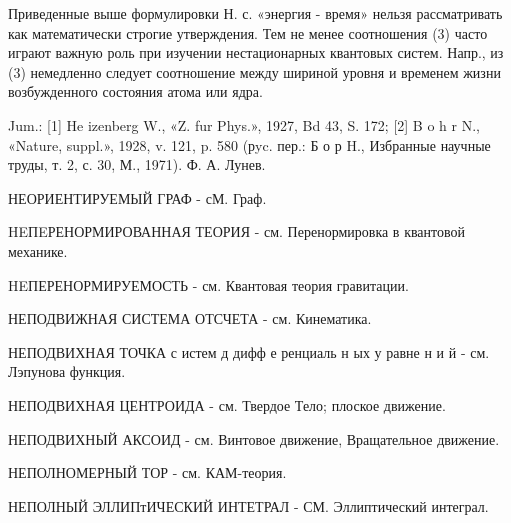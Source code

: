 \documentclass[10pt]{article}
\begin{document}
Приведенные выше формулировки Н. с. «энергия - время» нельзя рассматривать как математически строгие утверждения. Тем не менее соотношения (3) часто играют важную роль при изучении нестационарных квантовых систем. Напр., из (3) немедленно следует соотношение между шириной уровня и временем жизни возбужденного состояния атома или ядра.



Jum.: [1] He izenberg W., «Z. fur Phys.», 1927, Bd 43, S. 172; [2] B o h r N., «Nature, suppl.», 1928, v. 121, p. 580 (рyc. пер.: Б о р H., Избранные научные труды, т. 2, с. 30, М., 1971). Ф. А. Лунев.



НЕОРИЕНТИРУЕМЫЙ ГРАФ - сМ. Граф.



HEПEРЕНОРМИРОВАННАЯ ТЕОРИЯ - см. Перенормировка в квантовой механике.



HEПЕРЕНОРМИРУЕМОСТЬ - см. Квантовая теория гравитации.



НЕПОДВИЖНАЯ СИСТЕМА ОТСЧЕТА - см. Кинематика.



НЕПОДВИХНАЯ ТОЧКА с истем д дифф е ренциаль н ых у равне н и й - см. Лэпунова функция.



НЕПОДВИХНАЯ ЦЕНТРОИДА - см. Твердое Тело; плоское движение.



НЕПОДВИХНЫЙ АКСОИД - см. Винтовое движение, Вращательное движение.



НЕПОЛНОМЕРНЫЙ ТОР - см. КАМ-теория.



НЕПОЛНЫЙ ЭЛЛИПтИЧЕСКИЙ ИНТЕТРАЛ - СМ. Эллиптический интеграл.
\end{document}
